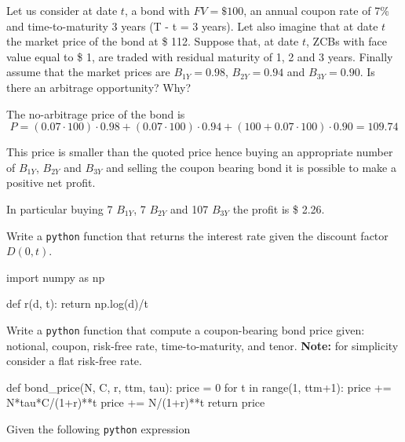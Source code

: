 \documentclass[12pt,a4paper]{exam}
\begin{document}
\begin{questions}
\question
Let us consider at date $t$, a bond with $FV = \$ 100$, an annual coupon rate of 7\% and time-to-maturity 3 years (T - t = 3 years).
Let also imagine that at date $t$ the market price of the bond at \$ 112.
Suppose that, at date $t$, ZCBs with face value equal to \$ 1, are traded with residual maturity of 1, 2 and 3 years.
Finally assume that the market prices are $B_{1Y} = 0.98$, $B_{2Y} = 0.94$ and $B_{3Y} = 0.90$.
Is there an arbitrage opportunity? Why?
\fillwithlines{3cm}
\begin{solution}
The no-arbitrage price of the bond is
\begin{equation*}
  P = (0.07\cdot100)\cdot 0.98 + (0.07\cdot100)\cdot 0.94 + (100 + 0.07\cdot100)\cdot 0.90 = 109.74
\end{equation*}

This price is smaller than the quoted price hence buying an appropriate number of $B_{1Y}$, $B_{2Y}$ and $B_{3Y}$ and selling the coupon bearing bond it is possible to make a positive net profit.

In particular buying 7 $B_{1Y}$, 7 $B_{2Y}$ and 107 $B_{3Y}$ the profit is \$ 2.26.
\end{solution}

\question
Write a \texttt{python} function that returns the interest rate given the discount factor $D(0, t)$.
\fillwithlines{3cm}
\begin{solution}
  \begin{ipython}
import numpy as np

def r(d, t):
    return np.log(d)/t
  \end{ipython}
\end{solution}
\question
Write a \texttt{python} function that compute a coupon-bearing bond price given: notional, coupon, risk-free rate, time-to-maturity, and tenor.
\textbf{Note:} for simplicity consider a flat risk-free rate.
\fillwithlines{3cm}
\begin{solution}
  \begin{ipython}
def bond_price(N, C, r, ttm, tau):
    price = 0
    for t in range(1, ttm+1):
        price += N*tau*C/(1+r)**t
    price += N/(1+r)**t
    return price    
    \end{ipython}
\end{solution}
\question
Given the following \texttt{python} expression


\end{questions}
\end{document}
